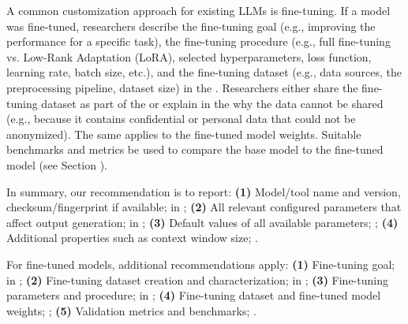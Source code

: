 A common customization approach for existing LLMs is fine-tuning. If a model was fine-tuned, researchers \must describe the fine-tuning goal (e.g., improving the performance for a specific task), the fine-tuning procedure (e.g., full fine-tuning vs. Low-Rank Adaptation (LoRA), selected hyperparameters, loss function, learning rate, batch size, etc.), and the fine-tuning dataset (e.g., data sources, the preprocessing pipeline, dataset size) in the \paper.
Researchers \should either share the fine-tuning dataset as part of the \supplementarymaterial or explain in the \paper why the data cannot be shared (e.g., because it contains confidential or personal data that could not be anonymized).
The same applies to the fine-tuned model weights.
Suitable benchmarks and metrics \should be used to compare the base model to the fine-tuned model (see Section \benchmarksmetrics).

In summary, our recommendation is to report:
\textbf{(1)} Model/tool name and version, checksum/fingerprint if available; \must in \paper;
\textbf{(2)} All relevant configured parameters that affect output generation; \must in \paper;
\textbf{(3)} Default values of all available parameters; \should;
\textbf{(4)} Additional properties such as context window size; \may.

For fine-tuned models, additional recommendations apply:
\textbf{(1)} Fine-tuning goal; \must in \paper;
\textbf{(2)} Fine-tuning dataset creation and characterization; \must in \paper;
\textbf{(3)} Fine-tuning parameters and procedure; \must in \paper;
\textbf{(4)} Fine-tuning dataset and fine-tuned model weights; \should;
\textbf{(5)} Validation metrics and benchmarks; \should.

